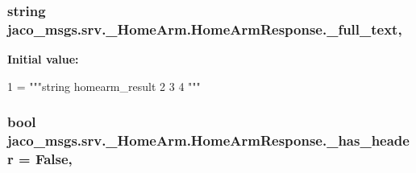 \subsubsection[{\texorpdfstring{\+\_\+full\+\_\+text}{_full_text}}]{\setlength{\rightskip}{0pt plus 5cm}string jaco\+\_\+msgs.\+srv.\+\_\+\+Home\+Arm.\+Home\+Arm\+Response.\+\_\+full\+\_\+text\hspace{0.3cm}{\ttfamily [static]}, {\ttfamily [private]}}\hypertarget{classjaco__msgs_1_1srv_1_1__HomeArm_1_1HomeArmResponse_a93833b18a9eb783bf8f1a40ff63af20c}{}\label{classjaco__msgs_1_1srv_1_1__HomeArm_1_1HomeArmResponse_a93833b18a9eb783bf8f1a40ff63af20c}
{\bfseries Initial value\+:}
\begin{DoxyCode}
1 = \textcolor{stringliteral}{"""string homearm\_result}
2 \textcolor{stringliteral}{}
3 \textcolor{stringliteral}{}
4 \textcolor{stringliteral}{"""}
\end{DoxyCode}
\subsubsection[{\texorpdfstring{\+\_\+has\+\_\+header}{_has_header}}]{\setlength{\rightskip}{0pt plus 5cm}bool jaco\+\_\+msgs.\+srv.\+\_\+\+Home\+Arm.\+Home\+Arm\+Response.\+\_\+has\+\_\+header = False\hspace{0.3cm}{\ttfamily [static]}, {\ttfamily [private]}}\hypertarget{classjaco__msgs_1_1srv_1_1__HomeArm_1_1HomeArmResponse_a6e4db6dcbc837c615c831bd7bb31891d}{}\label{classjaco__msgs_1_1srv_1_1__HomeArm_1_1HomeArmResponse_a6e4db6dcbc837c615c831bd7bb31891d}
